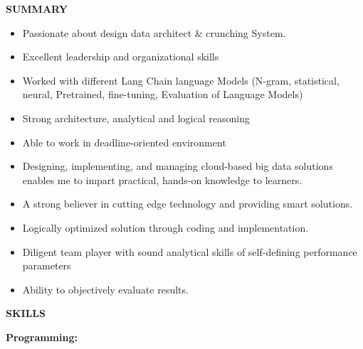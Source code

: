 \documentclass[a4paper]{article}
\begin{document}
\textbf{SUMMARY}

\begin{itemize}
\item
  Passionate about design data architect \& crunching System.
\item
  Excellent leadership and organizational skills
\item
  Worked with different Lang Chain language Models (N-gram, statistical,
  neural, Pretrained, fine-tuning, Evaluation of Language Models)
\item
  Strong architecture, analytical and logical reasoning
\item
  Able to work in deadline-oriented environment
\item
  Designing, implementing, and managing cloud-based big data solutions
  enables me to impart practical, hands-on knowledge to learners.
\item
  A strong believer in cutting edge technology and providing smart
  solutions.
\item
  Logically optimized solution through coding and implementation.
\item
  Diligent team player with sound analytical skills of self-defining
  performance parameters
\item
  Ability to objectively evaluate results.
\end{itemize}

\textbf{SKILLS}

\textbf{Programming:}
\end{document}
